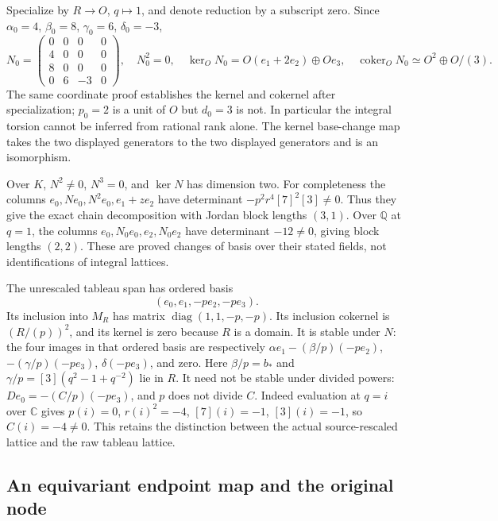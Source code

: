 Specialize by $R\to O$, $q\mapsto1$, and denote reduction by a subscript
zero. Since $\alpha_0=4$, $\beta_0=8$, $\gamma_0=6$, $\delta_0=-3$,
\[
 N_0=\begin{pmatrix}0&0&0&0\\4&0&0&0\\8&0&0&0\\0&6&-3&0\end{pmatrix},
 \quad N_0^2=0,
 \quad\ker_ON_0=O(e_1+2e_2)\oplus Oe_3,
 \quad\operatorname{coker}_ON_0\simeq O^2\oplus O/(3).
\]
The same coordinate proof establishes the kernel and cokernel after
specialization; $p_0=2$ is a unit of $O$ but $d_0=3$ is not.
In particular the integral torsion cannot be inferred from rational
rank alone. The kernel base-change map takes the two displayed
generators to the two displayed generators and is an isomorphism.

Over $K$, $N^2\ne0$, $N^3=0$, and $\ker N$ has dimension two.
For completeness the columns
$e_0,Ne_0,N^2e_0,e_1+ze_2$ have determinant
$-p^2r^4[7]^2[3]\ne0$. Thus they give the exact chain decomposition
with Jordan block lengths $(3,1)$. Over $\mathbb Q$ at $q=1$, the
columns $e_0,N_0e_0,e_2,N_0e_2$ have determinant $-12\ne0$,
giving block lengths $(2,2)$. These are proved changes of basis over
their stated fields, not identifications of integral lattices.

The unrescaled tableau span has ordered basis
\[
 (e_0,e_1,-pe_2,-pe_3).
\]
Its inclusion into $M_R$ has matrix
$\operatorname{diag}(1,1,-p,-p)$.
Its inclusion cokernel is $(R/(p))^2$, and its kernel is zero because
$R$ is a domain. It is stable under $N$: the four images in that
ordered basis are respectively
$\alpha e_1-(\beta/p)(-pe_2)$, $-(\gamma/p)(-pe_3)$,
$\delta(-pe_3)$, and zero. Here $\beta/p=b_*$ and
$\gamma/p=[3](q^2-1+q^{-2})$ lie in $R$.
It need not be stable under divided powers: $De_0=-(C/p)(-pe_3)$,
and $p$ does not divide $C$. Indeed evaluation at $q=i$ over
$\mathbb C$ gives $p(i)=0$, $r(i)^2=-4$, $[7](i)=-1$,
$[3](i)=-1$, so $C(i)=-4\ne0$. This retains the distinction between
the actual source-rescaled lattice and the raw tableau lattice.

\subsection{An equivariant endpoint map and the original node}

